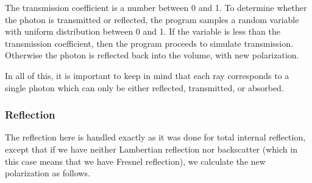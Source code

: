 The transmission coefficient is a number between 0 and 1. To determine whether
the photon is transmitted or reflected, the program samples a random variable
with uniform distribution between 0 and 1. If the variable is less than the
transmission coefficient, then the program proceeds to simulate transmission.
Otherwise the photon is reflected back into the volume, with new polarization.

In all of this, it is important to keep in mind that each ray
corresponds to a single photon which can only be either reflected,
transmitted, or absorbed.

\subsubsection{Reflection}

The reflection here is handled exactly as it was done for total internal
reflection, except that if we have neither Lambertian reflection nor backscatter
(which in this case means that we have Fresnel reflection), we calculate the
new polarization as follows.

